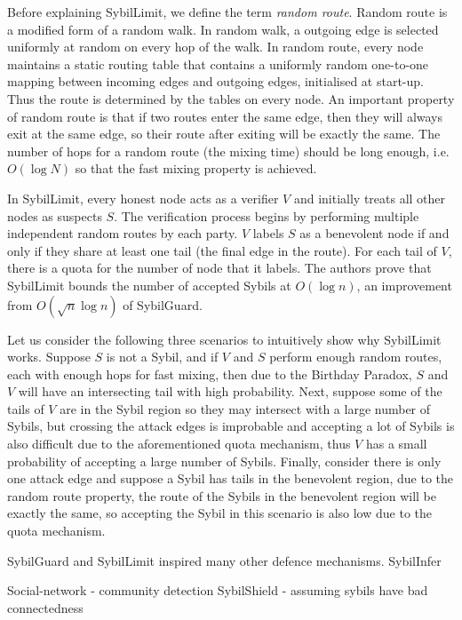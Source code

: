 Before explaining SybilLimit, we define the term \emph{random route}. Random
route is a modified form of a random walk. In random walk, a outgoing edge is
selected uniformly at random on every hop of the walk. In random route, every
node maintains a static routing table that contains a uniformly random
one-to-one mapping between incoming edges and outgoing edges, initialised at
start-up. Thus the route is determined by the tables on every node. An important
property of random route is that if two routes enter the same edge, then they
will always exit at the same edge, so their route after exiting will be exactly
the same. The number of hops for a random route (the mixing time) should be long
enough, i.e. $O(\log{N})$ so that the fast mixing property is achieved.

In SybilLimit, every honest node acts as a verifier $V$ and initially treats all
other nodes as suspects $S$. The verification process begins by performing
multiple independent random routes by each party. $V$ labels $S$ as a benevolent
node if and only if they share at least one tail (the final edge in the route).
For each tail of $V$, there is a quota for the number of node that it labels.
The authors prove that SybilLimit bounds the number of accepted Sybils at
$O(\log{n})$, an improvement from $O(\sqrt{n} \log{n})$ of SybilGuard.

Let us consider the following three scenarios to intuitively show why SybilLimit
works. Suppose $S$ is not a Sybil, and if $V$ and $S$ perform enough random
routes, each with enough hops for fast mixing, then due to the Birthday Paradox,
$S$ and $V$ will have an intersecting tail with high probability. Next, suppose
some of the tails of $V$ are in the Sybil region so they may intersect with a
large number of Sybils, but crossing the attack edges is improbable and
accepting a lot of Sybils is also difficult due to the aforementioned quota
mechanism, thus $V$ has a small probability of accepting a large number of
Sybils. Finally, consider there is only one attack edge and suppose a Sybil has
tails in the benevolent region, due to the random route property, the route of
the Sybils in the benevolent region will be exactly the same, so accepting the
Sybil in this scenario is also low due to the quota mechanism.

SybilGuard and SybilLimit inspired many other defence mechanisms.
SybilInfer\cite{danezis2009sybilinfer}

Social-network\cite{viswanath2010analysis} - community detection
SybilShield\cite{shi2013sybilshield} - assuming sybils have bad connectedness

